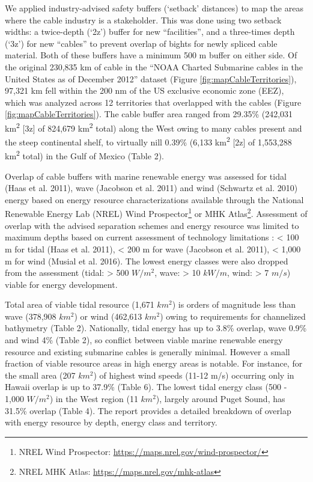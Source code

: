 \documentclass[]{article}
\let\rmarkdownfootnote\footnote%
\def\footnote{\protect\rmarkdownfootnote}
\begin{document}
We applied industry-advised safety buffers (`setback' distances) to map
the areas where the cable industry is a stakeholder. This was done using
two setback widths: a twice-depth (`2z') buffer for new ``facilities'',
and a three-times depth (`3z') for new ``cables'' to prevent overlap of
bights for newly spliced cable material. Both of these buffers have a
minimum 500 m buffer on either side. Of the original 230,835 km of cable
in the ``NOAA Charted Submarine cables in the United States as of
December 2012'' dataset (Figure \ref{fig:mapCableTerritories}), 97,321
km fell within the 200 nm of the US exclusive economic zone (EEZ), which
was analyzed across 12 territories that overlapped with the cables
(Figure \ref{fig:mapCableTerritories}). The cable buffer area ranged
from 29.35\% (242,031 km\textsuperscript{2} {[}3z{]} of 824,679
km\textsuperscript{2} total) along the West owing to many cables present
and the steep continental shelf, to virtually nill 0.39\% (6,133
km\textsuperscript{2} {[}2z{]} of 1,553,288 km\textsuperscript{2} total)
in the Gulf of Mexico (Table 2).

Overlap of cable buffers with marine renewable energy was assessed for
tidal (Haas et al. 2011), wave (Jacobson et al. 2011) and wind (Schwartz
et al. 2010) energy based on energy resource characterizations available
through the National Renewable Energy Lab (NREL) Wind
Prospector\footnote{NREL Wind Prospector:
  \url{https://maps.nrel.gov/wind-prospector/}} or MHK Atlas\footnote{NREL
  MHK Atlas: \url{https://maps.nrel.gov/mhk-atlas}}. Assessment of
overlap with the advised separation schemes and energy resource was
limited to maximum depths based on current assessment of technology
limitations : \textless{} 100 m for tidal (Haas et al. 2011),
\textless{} 200 m for wave (Jacobson et al. 2011), \textless{} 1,000 m
for wind (Musial et al. 2016). The lowest energy classes were also
dropped from the assessment (tidal: \textgreater{} 500 \(W/m^2\), wave:
\textgreater{} 10 \(kW/m\), wind: \textgreater{} 7 \(m/s\)) viable for
energy development.

Total area of viable tidal resource (1,671 \(km^2\)) is orders of
magnitude less than wave (378,908 \(km^2\)) or wind (462,613 \(km^2\))
owing to requirements for channelized bathymetry (Table 2). Nationally,
tidal energy has up to 3.8\% overlap, wave 0.9\% and wind 4\% (Table 2),
so conflict between viable marine renewable energy resource and existing
submarine cables is generally minimal. However a small fraction of
viable resource areas in high energy areas is notable. For instance, for
the small area (207 \(km^2\)) of highest wind speeds (11-12 m/s)
occurring only in Hawaii overlap is up to 37.9\% (Table 6). The lowest
tidal energy class (500 - 1,000 \(W/m^2\)) in the West region (11
\(km^2\)), largely around Puget Sound, has 31.5\% overlap (Table 4). The
report provides a detailed breakdown of overlap with energy resource by
depth, energy class and territory.
\end{document}
